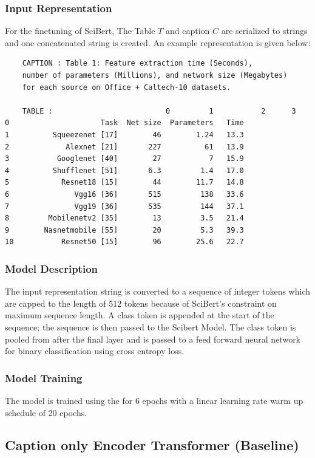 \subsubsection{Input Representation}
\label{table_classification:models:sb:input_rep}
For the finetuning of SciBert, The Table $T$ and caption $C$ are serialized to strings and one concatenated string is created. An example representation is given below: 
\begin{verbatim}
    CAPTION : Table 1: Feature extraction time (Seconds), 
    number of parameters (Millions), and network size (Megabytes) 
    for each source on Office + Caltech-10 datasets.

    TABLE :                          0         1           2      3
0                     Task  Net size  Parameters   Time
1          Squeezenet [17]        46        1.24   13.3
2             Alexnet [21]       227          61   13.9
3           Googlenet [40]        27           7   15.9
4          Shufflenet [51]       6.3         1.4   17.0
5            Resnet18 [15]        44        11.7   14.8
6               Vgg16 [36]       515         138   33.6
7               Vgg19 [36]       535         144   37.1
8         Mobilenetv2 [35]        13         3.5   21.4
9        Nasnetmobile [55]        20         5.3   39.3
10           Resnet50 [15]        96        25.6   22.7
\end{verbatim}

\subsubsection{Model Description}
The input representation string is converted to a sequence of integer tokens which are capped to the length of 512 tokens because of SciBert's constraint on maximum sequence length. A class token is appended at the start of the sequence; the sequence is then passed to the Scibert Model. The class token is pooled from after the final layer and is passed to a feed forward neural network for binary classification using cross entropy loss. 


\subsubsection{Model Training}
The model is trained using the for 6 epochs with a linear learning rate warm up schedule of 20 epochs.

\subsection{Caption only Encoder Transformer (Baseline)}

